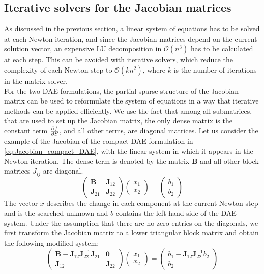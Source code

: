 \subsection{Iterative solvers for the Jacobian matrices}
\label{ssec:iterative_solver_Jacobian}
As discussed in the previous section, a linear system of equations has to be solved at each Newton iteration, and since the Jacobian matrices depend on the current solution vector, an expensive LU decomposition in $\mathcal{O}\left(n^3\right)$ has to be calculated at each step. This can be avoided with iterative solvers, which reduce the complexity of each Newton step to $\mathcal{O}\left(kn^2\right)$, where $k$ is the number of iterations in the matrix solver. \\
For the two DAE formulations, the partial sparse structure of the Jacobian matrix can be used to reformulate the system of equations in a way that iterative methods can be applied efficiently. We use the fact that among all submatrices, that are used to set up the Jacobian matrix, the only dense matrix is the constant term $\pdv{f}{S}$, and all other terms, are diagonal matrices. Let us consider the example of the Jacobian of the compact DAE formulation in \autoref{eq:Jacobian_compact_DAE}, with the linear system in which it appears in the Newton iteration. The dense term is denoted by the matrix $\mathbf{B}$ and all other block matrices $J_{ij}$ are diagonal.
\begin{equation}
	\begin{pmatrix}
		\mathbf{B} & \mathbf{J}_{12} \\ 
		\mathbf{J}_{21} & \mathbf{J}_{22} 
	\end{pmatrix} \begin{pmatrix}
		x_1 \\ x_2
	\end{pmatrix} = \begin{pmatrix}
		b_1 \\ b_2
	\end{pmatrix} 
\end{equation}
The vector $x$ describes the change in each component at the current Newton step and is the searched unknown and $b$ contains the left-hand side of the DAE system. Under the assumption that there are no zero entries on the diagonals, we first transform the Jacobian matrix to a lower triangular block matrix and obtain the following modified system: 
\begin{equation}
	\begin{pmatrix}
		\mathbf{B} - \mathbf{J}_{12}\mathbf{J}_{22}^{-1}\mathbf{J}_{21} & \mathbf{0} \\ 
		\mathbf{J}_{12} & \mathbf{J}_{22} 
	\end{pmatrix} \begin{pmatrix}
		x_1 \\ x_2
	\end{pmatrix} = \begin{pmatrix}
		b_1 - \mathbf{J}_{12}\mathbf{J}_{22}^{-1}b_2 \\ b_2
	\end{pmatrix} 
\end{equation}

